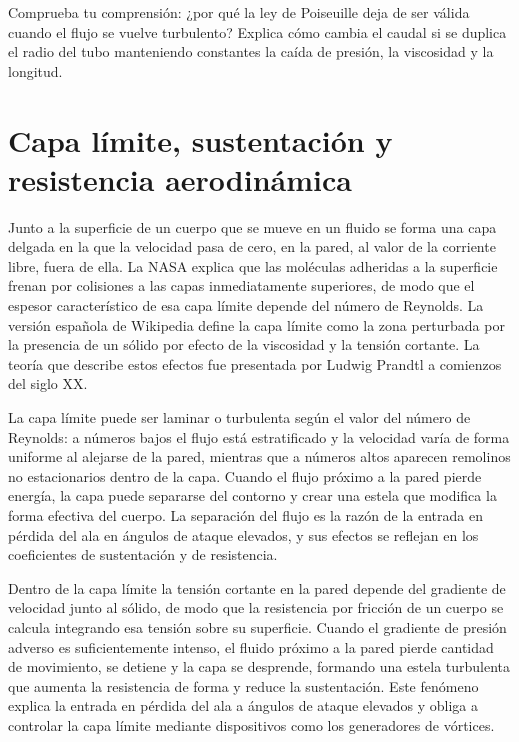 \documentclass{book}
\begin{document}
\begin{tcolorbox}[title={Autoficha}, studiumcheck, breakable]

Comprueba tu comprensión: ¿por qué la ley de Poiseuille deja de ser válida cuando el flujo se vuelve turbulento? Explica cómo cambia el caudal si se duplica el radio del tubo manteniendo constantes la caída de presión, la viscosidad y la longitud.
\end{tcolorbox}

\chapter{Capa límite, sustentación y resistencia aerodinámica}

Junto a la superficie de un cuerpo que se mueve en un fluido se forma una capa delgada en la que la velocidad pasa de cero, en la pared, al valor de la corriente libre, fuera de ella. La NASA explica que las moléculas adheridas a la superficie frenan por colisiones a las capas inmediatamente superiores, de modo que el espesor característico de esa capa límite depende del número de Reynolds. La versión española de Wikipedia define la capa límite como la zona perturbada por la presencia de un sólido por efecto de la viscosidad y la tensión cortante. La teoría que describe estos efectos fue presentada por Ludwig Prandtl a comienzos del siglo XX.

La capa límite puede ser laminar o turbulenta según el valor del número de Reynolds: a números bajos el flujo está estratificado y la velocidad varía de forma uniforme al alejarse de la pared, mientras que a números altos aparecen remolinos no estacionarios dentro de la capa. Cuando el flujo próximo a la pared pierde energía, la capa puede separarse del contorno y crear una estela que modifica la forma efectiva del cuerpo. La separación del flujo es la razón de la entrada en pérdida del ala en ángulos de ataque elevados, y sus efectos se reflejan en los coeficientes de sustentación y de resistencia.

Dentro de la capa límite la tensión cortante en la pared depende del gradiente de velocidad junto al sólido, de modo que la resistencia por fricción de un cuerpo se calcula integrando esa tensión sobre su superficie. Cuando el gradiente de presión adverso es suficientemente intenso, el fluido próximo a la pared pierde cantidad de movimiento, se detiene y la capa se desprende, formando una estela turbulenta que aumenta la resistencia de forma y reduce la sustentación. Este fenómeno explica la entrada en pérdida del ala a ángulos de ataque elevados y obliga a controlar la capa límite mediante dispositivos como los generadores de vórtices.
\end{document}
